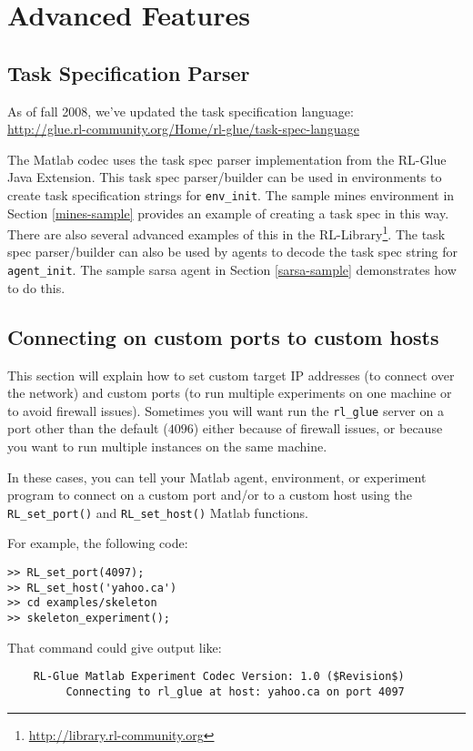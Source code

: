 \documentclass[11pt]{article}
\begin{document}
\section{Advanced Features}
\subsection{Task Specification Parser}
As of fall 2008, we've updated the task specification language:\\
\url{http://glue.rl-community.org/Home/rl-glue/task-spec-language}

The Matlab codec uses the task spec parser implementation from the RL-Glue Java Extension.  This task spec parser/builder can be used in environments to create task specification strings for \texttt{env\_init}.  The sample mines environment in Section \ref{mines-sample} provides an example of creating a task spec in this way.  There are also several advanced examples of this in the RL-Library\footnote{\url{http://library.rl-community.org}}.  The task spec parser/builder can also be used by agents to decode the task spec string for \texttt{agent\_init}.  The sample sarsa agent in Section \ref{sarsa-sample} demonstrates how to do this.


\subsection{Connecting on custom ports to custom hosts}
This section will explain how to set custom target IP addresses (to connect over the network) and custom ports (to run multiple experiments on one machine or to avoid firewall issues).
Sometimes you will want run the \texttt{rl\_glue} server on a port other than the default
($4096$) either because of firewall issues, or because you want to run multiple instances on the same machine.

In these cases, you can tell your Matlab agent, environment, or experiment program to connect on a custom port and/or to a custom host using the  \texttt{RL\_set\_port()} and \texttt{RL\_set\_host()} Matlab functions.

For example, the following code:
\begin{verbatim}
>> RL_set_port(4097);
>> RL_set_host('yahoo.ca')
>> cd examples/skeleton
>> skeleton_experiment();
\end{verbatim}

That command could give output like:
\begin{verbatim}
	RL-Glue Matlab Experiment Codec Version: 1.0 ($Revision$)
	     Connecting to rl_glue at host: yahoo.ca on port 4097
\end{verbatim}
\end{document}
